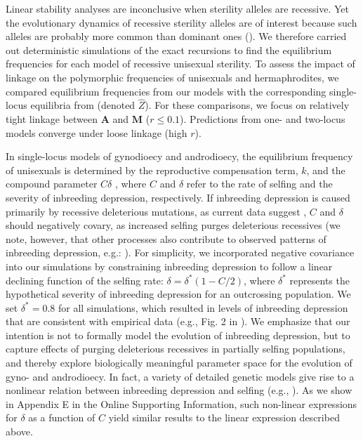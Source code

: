 \documentclass{article}
\newcommand\hl[1]{%
  \bgroup
  \hskip0pt\color{blue!80!black}%
  #1%
  \egroup
}
\begin{document}
Linear stability analyses are inconclusive when sterility alleles are recessive. Yet the evolutionary dynamics of recessive sterility alleles are of interest because such alleles are probably more common than dominant ones (\citealt{Charlesworth1978a}). 
We therefore carried out deterministic simulations of the exact recursions to find the equilibrium frequencies for each model of recessive unisexual sterility. To assess the impact of linkage on the polymorphic frequencies of unisexuals and hermaphrodites, we compared equilibrium frequencies from our models with the corresponding single-locus equilibria from \citet{Charlesworth1978a} (denoted $\hat{Z}$). For these comparisons, we focus on relatively tight linkage between $\mathbf{A}$ and $\mathbf{M}$ ($r\leq 0.1$). Predictions from one- and two-locus models converge under loose linkage (high $r$). 

In single-locus models of gynodioecy and androdioecy, the equilibrium frequency of unisexuals is determined by the reproductive compensation term, $k$, and the compound parameter $C \delta$ \citep{Charlesworth1978a}, where $C$ and $\delta$ refer to the rate of selfing and the severity of inbreeding depression, respectively. If inbreeding depression is caused primarily by recessive deleterious mutations, as current data suggest \citep{Charlesworth2009}, $C$ and $\delta$ should negatively covary, as increased selfing purges deleterious recessives \hl{(we note, however, that other processes also contribute to observed patterns of inbreeding depression, e.g.:} \citealt{CrnokrakBarrett2002, Charlesworth-etal-2007, Charlesworth2009, HedrickGarcia-Dorado2016}). For simplicity, we \hl{incorporated} negative covariance into our simulations by constraining inbreeding depression to follow a linear declining function of the selfing rate: $\delta = \delta^\ast(1 - C/2)$, where $\delta^\ast$ represents the hypothetical severity of inbreeding depression for an outcrossing population. We set $\delta^\ast = 0.8$ for all simulations, which resulted in levels of inbreeding depression that are consistent with empirical data (e.g., Fig. 2 in \citealt{HusbandSchemske1996}). We emphasize that our intention is not to formally model the evolution of inbreeding depression, but to capture effects of purging deleterious recessives in partially selfing populations, and thereby explore biologically meaningful parameter space for the evolution of gyno- and androdioecy. In fact, a variety of detailed genetic models give rise to a nonlinear relation between inbreeding depression and selfing (e.g., \citealt{OhtaCockerham1974, LandeSchemske1985, Charlesworth1985, Roze2015, Garcia-Dorado2017, LandePorcher2017}). As we show in Appendix E in the Online Supporting Information, such non-linear expressions for $\delta$ as a function of $C$ yield similar results to the linear expression described above. 
\end{document}
